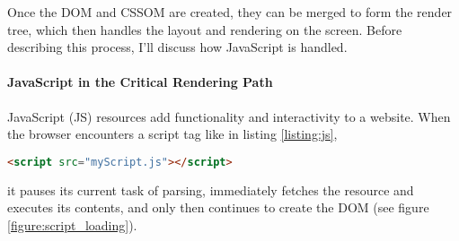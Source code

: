 
Once the DOM and CSSOM are created, they can be merged to form the render tree, which then handles the layout and rendering on the screen.
Before describing this process, I'll discuss how JavaScript is handled.







\paragraph{JavaScript in the Critical Rendering Path} %


JavaScript (JS) resources add functionality and interactivity to a website.
When the browser encounters a script tag like in listing \ref{listing:js},

\begin{center}
\begin{lstlisting}[caption={Link to a JS file from the main document}, label={listing:js}, language=html, numbers=none]
<script src="myScript.js"></script>
\end{lstlisting}
\end{center}

it pauses its current task of parsing, immediately fetches the resource and executes its contents, and only then continues to create the DOM (see figure \ref{figure:script_loading}). %

